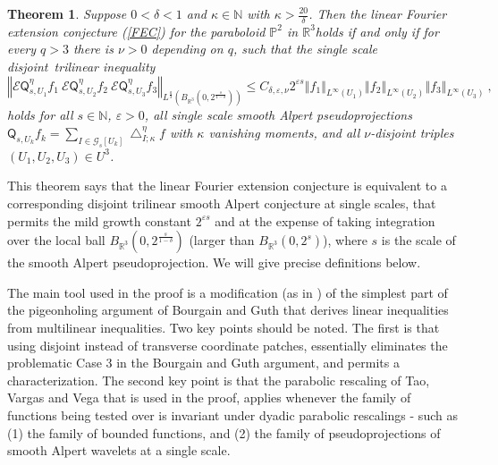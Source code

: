 \documentclass{amsart}%
\newtheorem{theorem}{Theorem}
\theoremstyle{plain}
\numberwithin{equation}{section}
\begin{document}
\begin{theorem}
\label{single main Alpert}Suppose $0<\delta<1$ and $\kappa\in\mathbb{N}$ with
$\kappa>\frac{20}{\delta}$. Then the linear Fourier extension conjecture
(\ref{FEC}) for the paraboloid $\mathbb{P}^{2}$ in $\mathbb{R}^{3} $holds
\emph{if and only if} for every $q>3$ there is $\nu>0$ depending on $q$, such
that the single scale disjoint\emph{\ }trilinear inequality%
\[
\left\Vert \mathcal{E}\mathsf{Q}_{s,U_{1}}^{\eta}f_{1}\ \mathcal{E}%
\mathsf{Q}_{s,U_{2}}^{\eta}f_{2}\ \mathcal{E}\mathsf{Q}_{s,U_{3}}^{\eta}%
f_{3}\right\Vert _{L^{\frac{q}{3}}\left(  B_{\mathbb{R}^{3}}\left(
0,2^{\frac{s}{1-\delta}}\right)  \right)  }\leq C_{\delta,\varepsilon,\nu
}2^{\varepsilon s}\left\Vert f_{1}\right\Vert _{L^{\infty}\left(
U_{1}\right)  }\left\Vert f_{2}\right\Vert _{L^{\infty}\left(  U_{2}\right)
}\left\Vert f_{3}\right\Vert _{L^{\infty}\left(  U_{3}\right)  }\ ,
\]
holds for all $s\in\mathbb{N}$, $\varepsilon>0$, all single scale smooth
Alpert pseudoprojections $\mathsf{Q}_{s,U_{k}}f_{k}=\sum_{I\in\mathcal{G}%
_{s}\left[  U_{k}\right]  }\bigtriangleup_{I;\kappa}^{\eta}f$ with $\kappa$
vanishing moments, and all $\nu$-disjoint triples $\left(  U_{1},U_{2}%
,U_{3}\right)  \in U^{3}$.
\end{theorem}

This theorem says that the linear Fourier extension conjecture is equivalent
to a corresponding disjoint trilinear smooth Alpert conjecture at single
scales, that permits the mild growth constant $2^{\varepsilon s}$ and at the
expense of taking integration over the local ball $B_{\mathbb{R}^{3}}\left(
0,2^{\frac{s}{1-\delta}}\right)  $ (larger than $B_{\mathbb{R}^{3}}\left(
0,2^{s}\right)  $), where $s$ is the scale of the smooth Alpert
pseudoprojection. We will give precise definitions below.

The main tool used in the proof is a modification (as in \cite[proof of
Theorem 3]{RiSa}) of the simplest part of the pigeonholing argument of
Bourgain and Guth \cite{BoGu} that derives linear inequalities from
multilinear inequalities. Two key points should be noted. The first is that
using disjoint instead of transverse coordinate patches, essentially
eliminates the problematic Case 3 in the Bourgain and Guth argument, and
permits a characterization. The second key point is that the parabolic
rescaling of Tao, Vargas and Vega that is used in the proof, applies whenever
the family of functions being tested over is invariant under dyadic parabolic
rescalings - such as (1) the family of bounded functions, and (2) the family
of pseudoprojections of smooth Alpert wavelets at a single scale.
\end{document}
